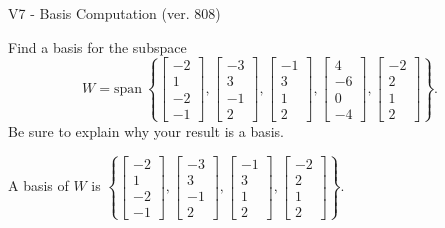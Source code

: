 \begin{exercise}
  \begin{exerciseTitle}V7 - Basis Computation (ver. 808)\end{exerciseTitle}
  \begin{exerciseStatement}
    Find a basis for the subspace 
\[W=\mathrm{span}\ \left\{\left[\begin{array}{r}
-2 \\
1 \\
-2 \\
-1
\end{array}\right] , \left[\begin{array}{r}
-3 \\
3 \\
-1 \\
2
\end{array}\right] , \left[\begin{array}{r}
-1 \\
3 \\
1 \\
2
\end{array}\right] , \left[\begin{array}{r}
4 \\
-6 \\
0 \\
-4
\end{array}\right] , \left[\begin{array}{r}
-2 \\
2 \\
1 \\
2
\end{array}\right]\right\}.\]
 Be sure to explain why your result is a basis.


  \end{exerciseStatement}
  \begin{exerciseAnswer}
   A basis of \(W\) is  \(\left\{\left[\begin{array}{r}
-2 \\
1 \\
-2 \\
-1
\end{array}\right] , \left[\begin{array}{r}
-3 \\
3 \\
-1 \\
2
\end{array}\right] , \left[\begin{array}{r}
-1 \\
3 \\
1 \\
2
\end{array}\right] , \left[\begin{array}{r}
-2 \\
2 \\
1 \\
2
\end{array}\right]\right\}\).
  


  \end{exerciseAnswer}
\end{exercise}